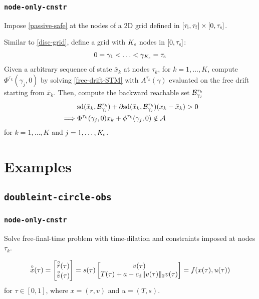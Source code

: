 \documentclass[11pt,a4paper]{article}
\begin{document}
\subsubsection{\texttt{node-only-cnstr}}

Impose \eqref{passive-safe} at the nodes of a 2D grid defined in $[\tau_{\mathrm{i}},\tau_{\mathrm{f}}]\times[0,\tau_{\mathrm{s}}]$.

Similar to \eqref{disc-grid}, define a grid with $K_{\mathrm{s}}$ nodes in $[0,\tau_{\mathrm{s}}]$:
\begin{align*}
    0 = \gamma_1 < \ldots < \gamma_{K_{\mathrm{s}}} = \tau_{\mathrm{s}} 
\end{align*}
Given a arbitrary sequence of state $\bar{x}_k$ at nodes $\tau_k$, for $k=1,\ldots,K$, compute $\Phi^{\tau_k}(\gamma_j,0)$ by solving \eqref{free-drift-STM} with $A^{\tau_k}(\gamma)$ evaluated on the free drift starting from $\bar{x}_k$. Then, compute the backward reachable set $\mathcal{B}_{\gamma_j}^{\tau_k}$
\begin{align*}
    & \mathrm{sd}(\bar{x}_k,\mathcal{B}^{\tau_k}_{\gamma_j}) + \partial\mathrm{sd}(\bar{x}_k,\mathcal{B}^{\tau_k}_{\gamma_j})(x_k - \bar{x}_k) > 0\\
    \implies & \Phi^{\tau_k}(\gamma_j,0)x_k + \phi^{\tau_k}(\gamma_j,0) \notin \mathcal{A}\\
\end{align*}
for $k=1,\ldots,K$ and $j=1,\ldots,K_{\mathrm{s}}$.

\section{Examples}

\subsection{\texttt{doubleint-circle-obs}}

\subsubsection{\texttt{node-only-cnstr}}
%
Solve free-final-time problem with time-dilation and constraints imposed at nodes $\tau_k$.

\begin{align}
    \overset{\circ}{x}(\tau) = \begin{bmatrix}
                        \overset{\circ}{r}(\tau)\\
                        \overset{\circ}{v}(\tau)
                     \end{bmatrix} = s(\tau)\begin{bmatrix}
                                        v(\tau)\\
                                        T(\tau)+a-c_{\mathrm{d}}\|v(\tau)\|_2v(\tau)
                                     \end{bmatrix} =  f(x(\tau),u(\tau))\label{dbl-intg-sys-dil}
\end{align}
for $\tau\in[0,1]$, where $x = (r,v)$ and $u=(T,s)$.
\end{document}
